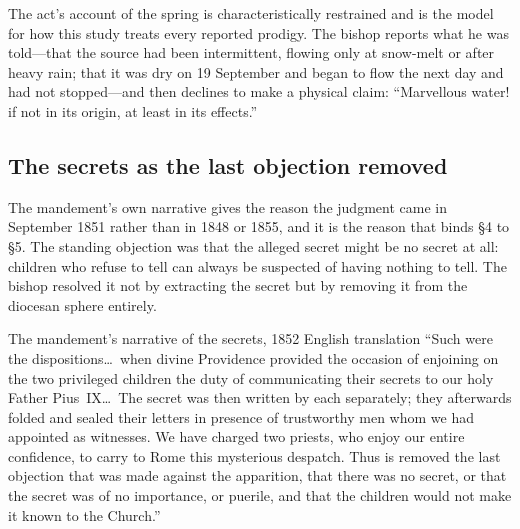 The act's account of the spring is characteristically restrained and
is the model for how this study treats every reported prodigy. The
bishop reports what he was told---that the source had been
intermittent, flowing only at snow-melt or after heavy rain; that it
was dry on 19 September and began to flow the next day and had not
stopped---and then declines to make a physical claim: ``Marvellous
water! if not in its origin, at least in its
effects.''

\subsection{The secrets as the last objection removed}

The mandement's own narrative gives the reason the judgment came in
September 1851 rather than in 1848 or 1855, and it is the reason
that binds \S4 to \S5. The standing objection was that the alleged
secret might be no secret at all: children who refuse to tell can
always be suspected of having nothing to tell. The bishop resolved
it not by extracting the secret but by removing it from the
diocesan sphere entirely.

\begin{witnesstext}{The mandement's narrative of the secrets, 1852
English translation}
``Such were the dispositions\ldots\ when divine Providence provided
the occasion of enjoining on the two privileged children the duty of
communicating their secrets to our holy Father Pius~IX\ldots\ The
secret was then written by each separately; they afterwards folded
and sealed their letters in presence of trustworthy men whom we had
appointed as witnesses. We have charged two priests, who enjoy our
entire confidence, to carry to Rome this mysterious despatch. Thus
is removed the last objection that was made against the apparition,
that there was no secret, or that the secret was of no importance,
or puerile, and that the children would not make it known to the
Church.''
\end{witnesstext}

